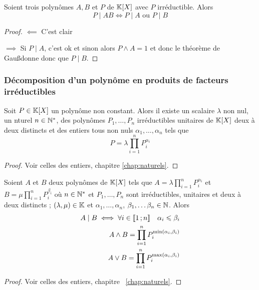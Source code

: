 \begin{prop}
  Soient trois polynômes \(A,B\) et \(P\) de \(\mathbb{K}[X]\) avec \(P\) irréductible. 
  Alors
  \begin{equation}
    P\mid{}AB \iff P\mid{}A \text{~ou~} P\mid{}B
  \end{equation}
\end{prop}
\begin{proof}
  \(\impliedby\) C'est clair

  \(\implies\) Si \(P\mid{}A\), c'est ok et sinon alors \(P \wedge A=1\) et donc 
  le théorème de Gau\ss donne donc que \(P\mid{}B\).
\end{proof}

\subsubsection{Décomposition d'un polynôme en produits de facteurs 
irréductibles}

\begin{theo}
  Soit \(P \in \mathbb{K}[X]\) un polynôme non constant. Alors il existe un scalaire 
  \(\lambda\) non nul, un nturel \(n \in \mathbb{N}^*\), des polynômes \(P_1, \ldots, 
  P_n\) irréductibles unitaires de \(\mathbb{K}[X]\) deux à deux distincts et des 
  entiers tous non nuls \(\alpha_1, \ldots, \alpha_n\) tels que
  \begin{equation}
    P = \lambda \prod_{i=1}^n P_i^{\alpha_i}
  \end{equation}
\end{theo}
\begin{proof}
  Voir celles des entiers, chapitre \ref{chap:naturels}.
\end{proof}

\begin{cor}
  Soient \(A\) et \(B\) deux polynômes de \(\mathbb{K}[X]\) tels que \(A=\lambda 
  \prod_{i=1}^n P_i^{\alpha_i}\) et \(B=\mu \prod_{i=1}^n P_i^{\beta_i}\) où \(n 
  \in \mathbb{N}^*\) et \(P_1, \ldots, P_n\) sont irréductibles, unitaires et deux à 
  deux distincts ; \((\lambda, \mu)\in\mathbb{K}\) et \(\alpha_1, \ldots, \alpha_n\), 
  \(\beta_1,\ldots \beta_n \in \mathbb{N}\). Alors
  \begin{align}
    A\mid{}B \iff \forall i \in \mathopen{\llbracket}1\mathclose{}\mathpunct{};n\mathclose{\rrbracket} \quad \alpha_i \leqslant 
    \beta_i \\
    A \wedge B = \prod_{i=1}^n P_i^{\min(\alpha_i,\beta_i)}\\
    A \vee B = \prod_{i=1}^n P_i^{\max(\alpha_i,\beta_i)}
  \end{align}
\end{cor}
\begin{proof}
  Voir celles des entiers, chapitre~
  \ref{chap:naturels}.
\end{proof}

